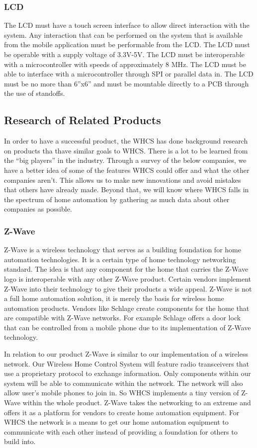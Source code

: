 \subsubsection{LCD}

The LCD must have a touch screen interface to allow direct interaction with the
system. Any interaction that can be performed on the system that is available
from the mobile application must be performable from the LCD. The LCD must be
operable with a supply voltage of 3.3V{}-5V. The LCD must be interoperable with
a microcontroller with speeds of approximately 8 MHz. The LCD must be able to
interface with a microcontroller through SPI or parallel data in. The LCD must
be no more than 6''x6'' and must be mountable directly to a PCB through the use
of standoffs.

\subsection{Research of Related Products}
In order to have a successful product, the WHCS has done background research on
products tha thave similar goals to WHCS. There is a lot to be learned from the
``big players'' in the industry. Through a survey of the below companies, we
have a better idea of some of the features WHCS could offer and what the other
companies aren't. This allows us to make new innovations and avoid mistakes
that others have already made. Beyond that, we will know where WHCS falls in
the spectrum of home automation by gathering as much data about other companies
as possible.

\subsubsection{Z-Wave}
Z{}-Wave is a wireless technology that serves as a building foundation for home
automation technologies. It is a certain type of home technology networking
standard. The idea is that any component for the home that carries the Z{}-Wave
logo is interoperable with any other Z{}-Wave product. Certain vendors
implement Z{}-Wave into their technology to give their products a wide appeal.
Z{}-Wave is not a full home automation solution, it is merely the basis for
wireless home automation products. Vendors like Schlage create components for
the home that are compatible with Z{}-Wave networks.  For example Schlage
offers a door lock that can be controlled from a mobile phone due to its
implementation of Z{}-Wave technology.

In relation to our product Z{}-Wave is similar to our
implementation of a wireless network. Our Wireless Home Control System will
feature radio transceivers that use a proprietary protocol to exchange
information. Only components within our system will be able to communicate
within the network. The network will also allow user{}'s mobile phones to join
in. So WHCS implements a tiny version of Z{}-Wave within the whole product.
Z{}-Wave takes the networking to an extreme and offers it as a platform for
vendors to create home automation equipment. For WHCS the network is a means to
get our home automation equipment to communicate with each other instead of
providing a foundation for others to build into.

